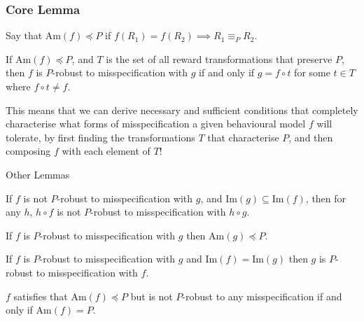 \documentclass{beamer}
\begin{document}

\begin{frame}
    \frametitle{Core Lemma}
    \small
    Say that $\mathrm{Am}(f) \preceq P$ if $f(R_1) = f(R_2) \implies R_1 \equiv_P R_2$.
    
    \vspace{0.5cm}
    \begin{lemma}%
        If $\mathrm{Am}(f) \preceq P$, 
        and $T$ is the set of all reward transformations that preserve $P$, then $f$ is $P$-robust to misspecification with $g$ if and only if $g = f \circ t$ for some $t \in T$ where $f \circ t \neq f$.
    \end{lemma}

    \vspace{0.5cm}
    This means that we can derive necessary and sufficient conditions that completely characterise what forms of misspecification a given behavioural model $f$ will tolerate, by first finding the transformations $T$ that characterise $P$, and then composing $f$ with each element of $T$!
\end{frame}

\begin{frame}{Other Lemmas}
    \begin{lemma}
    If $f$ is not $P$-robust to misspecification with $g$, and $\mathrm{Im}(g) \subseteq \mathrm{Im}(f)$, then for any $h$, $h \circ f$ is not $P$-robust to misspecification with $h \circ g$.
    \end{lemma}

    \begin{lemma}\label{lemma:rob_to_adm}
    If $f$ is $P$-robust to misspecification with $g$ then $\mathrm{Am}(g) \preceq P$.
    \end{lemma}

    \begin{lemma}\label{lemma:P_rob_symmetry}
    If $f$ is $P$-robust to misspecification with $g$ and $\mathrm{Im}(f) = \mathrm{Im}(g)$ then $g$ is $P$-robust to misspecification with $f$.
    \end{lemma}

    \begin{lemma}\label{lemma:ambiguity_robustness}
    $f$ satisfies that $\mathrm{Am}(f) \preceq P$ but is not $P$-robust to any misspecification if and only if $\mathrm{Am}(f) = P$.
    \end{lemma}
\end{frame}
\end{document}
